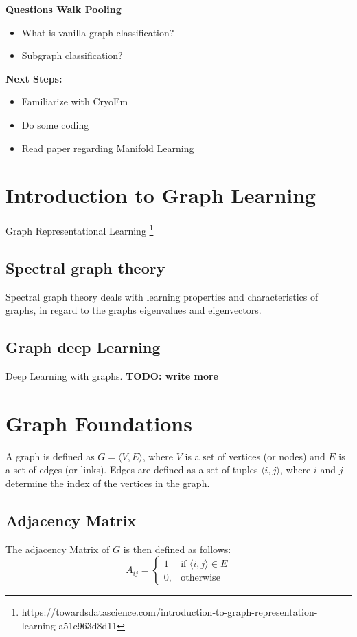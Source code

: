 \textbf{Questions Walk Pooling}
\begin{itemize}
    \item What is vanilla graph classification?
    \item Subgraph classification?
\end{itemize}


\textbf{Next Steps:}
\begin{itemize}
    \item Familiarize with CryoEm
    \item Do some coding
    \item Read paper regarding Manifold Learning
\end{itemize}

\section{Introduction to Graph Learning}

Graph Representational Learning
\footnote{https://towardsdatascience.com/introduction-to-graph-representation-learning-a51c963d8d11}


\subsection{Spectral graph theory}
Spectral graph theory \cite{SpectralGraphTheory} deals with learning properties and characteristics of graphs, in regard to
the graphs eigenvalues and eigenvectors. 

\subsection{Graph deep Learning}
Deep Learning with graphs.
\textbf{TODO: write more}


\section{Graph Foundations}
A graph is defined as  $G = \langle V,E \rangle$, where $V$ is a set of 
vertices (or nodes) and $E$ is a set of edges (or links). Edges are 
defined as a set of tuples $\langle i,j \rangle$, where $i$ and $j$ determine the 
index of the vertices in the graph.

\subsection{Adjacency Matrix}

The adjacency Matrix of $G$ is then defined as follows:
\begin{equation}
    A_{ij} =    
    \begin{cases}
        1  & \text{if } \langle i , j \rangle \in E \\
        0, & \text{otherwise}
    \end{cases}
\end{equation}

